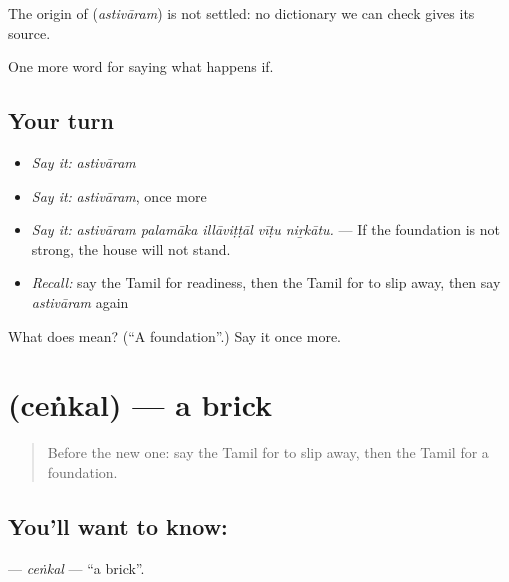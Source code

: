 \begin{cousinweb}
The origin of \textbf{} (\emph{astivāram}) is not settled: no dictionary we can check gives its source.
\end{cousinweb}

\begin{grammarlens}[title={What you've built}]
One more word for saying what happens if.
\end{grammarlens}

\subsection*{Your turn}
\begin{itemize}
\raggedright
  \item \emph{Say it:} \emph{astivāram}
  \item \emph{Say it:} \emph{astivāram}, once more
  \item \emph{Say it:} \emph{astivāram palamāka illāviṭṭāl vīṭu niṟkātu.} — If the foundation is not strong, the house will not stand.
  \item \emph{Recall:} say the Tamil for readiness, then the Tamil for to slip away, then say \emph{astivāram} again
\end{itemize}

\begin{tcolorbox}[breakable,colback=teal!4,colframe=teal!35!black,title={Before you move on}]
What does  mean? (\textquotedblleft{}A foundation\textquotedblright{}.) Say it once more.
\end{tcolorbox}
\section[\texorpdfstring{\ta{செங்கல்} (ceṅkal)}{செங்கல் (ceṅkal)}]{ (ceṅkal) — a brick}

\label{lesson:TA-C550-cenkal}



\begin{quote}
Before the new one: say the Tamil for to slip away, then the Tamil for a foundation.
\end{quote}

\subsection*{You'll want to know: }
\textbf{} — \emph{ceṅkal} — \textquotedblleft{}a brick\textquotedblright{}.

